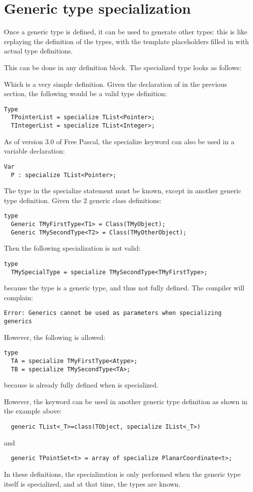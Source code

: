 \section{Generic type specialization}
Once a generic type is defined, it can be used to generate other types:
this is like replaying the definition of the types, with the template
placeholders filled in with actual type definitions.

This can be done in any  definition block. The specialized type
looks as follows:

Which is a very simple definition. Given the declaration of  in
the previous section, the following would be a valid type definition:
\begin{verbatim}
Type
  TPointerList = specialize TList<Pointer>;
  TIntegerList = specialize TList<Integer>;
\end{verbatim}
As of version 3.0 of Free Pascal, the specialize keyword can also be used in a variable declaration:
\begin{verbatim}
Var
  P : specialize TList<Pointer>;  
\end{verbatim}

The type in the specialize statement must be known, except in another generic type definition. 
Given the 2 generic class definitions:
\begin{verbatim}
type 
  Generic TMyFirstType<T1> = Class(TMyObject);
  Generic TMySecondType<T2> = Class(TMyOtherObject);
\end{verbatim}
Then the following specialization is not valid:
\begin{verbatim}
type
  TMySpecialType = specialize TMySecondType<TMyFirstType>;
\end{verbatim}
because the type  is a generic type, and thus not fully defined.  The compiler will complain:
\begin{verbatim}
Error: Generics cannot be used as parameters when specializing generics
\end{verbatim}

However, the following is allowed:
\begin{verbatim}
type
  TA = specialize TMyFirstType<Atype>;
  TB = specialize TMySecondType<TA>;
\end{verbatim}
because  is already fully defined when  is specialized.

However, the  keyword can be used in another generic type definition as shown in the example above:
\begin{verbatim}
  generic TList<_T>=class(TObject, specialize IList<_T>)
\end{verbatim}
and
\begin{verbatim}
  generic TPointSet<t> = array of specialize PlanarCoordinate<t>;
\end{verbatim}
In these definitions, the specialization is only performed when the generic type itself is specialized, 
and at that time, the types are known.

